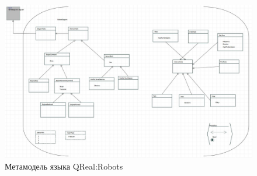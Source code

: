 \documentclass[a4paper]{article}
\begin{document}
{\begin{figure} [ht]
  \begin{center}
    \includegraphics[width=\textwidth]{robotsMetamodel.jpg}
    \caption{Метамодель языка QReal:Robots}
    \label{robotsMetamodel}
  \end{center}
\end{figure}

}
\end{document}
